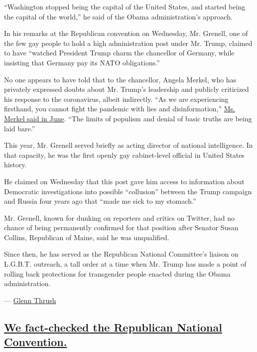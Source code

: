 ``Washington stopped being the capital of the United States, and started
being the capital of the world,'' he said of the Obama administration's
approach.

In his remarks at the Republican convention on Wednesday, Mr. Grenell,
one of the few gay people to hold a high administration post under Mr.
Trump, claimed to have ``watched President Trump charm the chancellor of
Germany, while insisting that Germany pay its NATO obligations.''

No one appears to have told that to the chancellor, Angela Merkel, who
has privately expressed doubts about Mr. Trump's leadership and publicly
criticized his response to the coronavirus, albeit indirectly. ``As we
are experiencing firsthand, you cannot fight the pandemic with lies and
disinformation,''
\href{https://www.cnn.com/2020/07/10/world/meanwhile-in-america-july-10-intl/index.html}{Ms.
Merkel said in June}. ``The limits of populism and denial of basic
truths are being laid bare.''

This year, Mr. Grenell served briefly as acting director of national
intelligence. In that capacity, he was the first openly gay
cabinet-level official in United States history.

He claimed on Wednesday that this post gave him access to information
about Democratic investigations into possible ``collusion'' between the
Trump campaign and Russia four years ago that ``made me sick to my
stomach.''

Mr. Grenell, known for dunking on reporters and critics on Twitter, had
no chance of being permanently confirmed for that position after Senator
Susan Collins, Republican of Maine, said he was unqualified.

Since then, he has served as the Republican National Committee's liaison
on L.G.B.T. outreach, a tall order at a time when Mr. Trump has made a
point of rolling back protections for transgender people enacted during
the Obama administration.

--- \href{https://www.nytimes3xbfgragh.onion/by/glenn-thrush}{Glenn
Thrush}

\hypertarget{we-fact-checked-the-republican-national-convention}{%
\subsection{\texorpdfstring{\protect\hyperlink{we-fact-checked-the-republican-national-convention}{We
fact-checked the Republican National
Convention.}}{We fact-checked the Republican National Convention.}}\label{we-fact-checked-the-republican-national-convention}}

